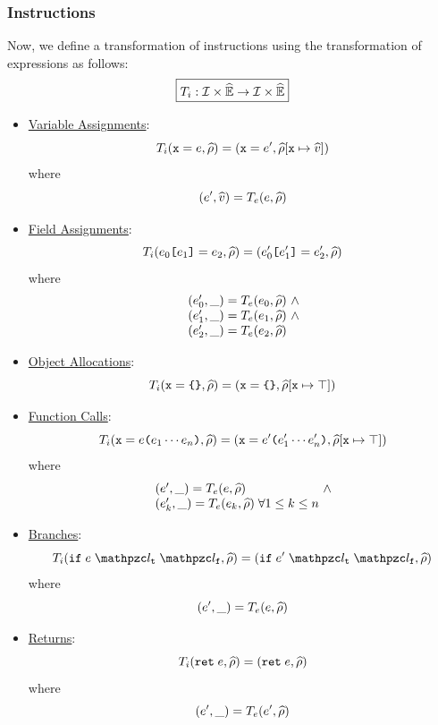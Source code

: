 \subsubsection{Instructions} Now, we define a transformation of instructions
using the transformation of expressions as follows:
\[
  \framebox{$\transformi: \instset \times \aenvset \rightarrow \instset \times
  \aenvset$}
\]
\begin{itemize}
  \item \underline{Variable Assignments}:
    \[
      T_i(\texttt{x} = e, \widehat{\rho}) =
      (\texttt{x} = e', \widehat{\rho}[\texttt{x} \mapsto \widehat{v}])
    \]
    where
    \[
      (e', \widehat{v}) = T_e(e, \widehat{\rho})
    \]

  \item \underline{Field Assignments}:
    \[
      T_i(e_0 \texttt{[} e_1 \texttt{]} = e_2, \widehat{\rho}) =
      (e'_0 \texttt{[} e'_1 \texttt{]} = e'_2, \widehat{\rho})
    \]
    where
    \[
      \begin{array}{l@{~}c@{~}ll}
        (\expr'_0, \_) = \transforme(\expr_0, \aenv) &\wedge\\
        (\expr'_1, \_) = \transforme(\expr_1, \aenv) &\wedge\\
        (\expr'_2, \_) = \transforme(\expr_2, \aenv)\\
      \end{array}
    \]
  \item \underline{Object Allocations}:
    \[
      T_i(\texttt{x} = \texttt{\{} \texttt{\}}, \widehat{\rho}) =
      (\texttt{x} = \texttt{\{} \texttt{\}}, \widehat{\rho}[\texttt{x} \mapsto \top])
    \]

  \item \underline{Function Calls}:
    \[
      T_i(\texttt{x} = e \texttt{(} e_1 \cdots e_n \texttt{)}, \widehat{\rho}) =
      (\texttt{x} = e' \texttt{(} e'_1 \cdots e'_n \texttt{)},
      \widehat{\rho}[\texttt{x} \mapsto \top])
    \]
    where
    \[
      \begin{array}{l@{~}c@{~}ll}
        (\expr', \_) = \transforme(\expr, \aenv) &\wedge\\
        (\expr'_k, \_) = \transforme(\expr_k, \aenv) \; \forall 1 \leq k \leq
        n\\
      \end{array}
    \]

  \item \underline{Branches}:
    \[
      \transformi(\kwif \; \expr \; \lab_\vart \; \lab_\varf, \aenv) =
      (\kwif \; \expr' \; \lab_\vart \; \lab_\varf, \aenv)
    \]
    where
    \[
      (e', \_) = T_e(e, \widehat{\rho})
    \]

  \item \underline{Returns}:
    \[
      T_i(\texttt{ret} \; e, \widehat{\rho}) =
      (\texttt{ret} \; e, \widehat{\rho})
    \]
    where
    \[
      (e', \_) = T_e(e', \widehat{\rho})
    \]
\end{itemize}

